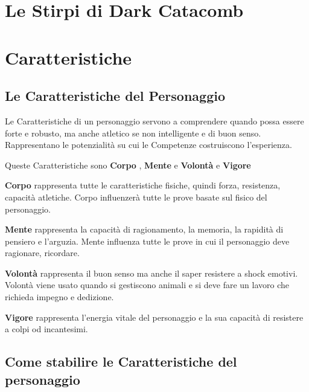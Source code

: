 \documentclass[12pt,a4paper,twoside,openany]{book}
\begin{document}
\section{Le Stirpi di Dark Catacomb}

\begin{multicols}{2}
	
\end{multicols}



\pagebreak

\section{Caratteristiche}

\begin{multicols}{2}

\subsection{Le Caratteristiche del Personaggio}

Le Caratteristiche di un personaggio servono a comprendere quando possa essere forte e robusto, ma anche atletico se non intelligente e di buon senso. Rappresentano le potenzialità su cui le Competenze costruiscono l'esperienza.

Queste Caratteristiche sono \textbf{Corpo} , \textbf{Mente}  e \textbf{Volontà}  e \textbf{Vigore}

\textbf{Corpo} rappresenta tutte le caratteristiche fisiche, quindi forza, resistenza, capacità atletiche. Corpo influenzerà tutte le prove basate sul fisico del personaggio.

\textbf{Mente} rappresenta la capacità di ragionamento, la memoria, la rapidità di pensiero e l'arguzia. Mente influenza tutte le prove in cui il personaggio deve ragionare, ricordare.

\textbf{Volontà} rappresenta il buon senso ma anche il saper resistere a shock emotivi. Volontà viene usato quando si gestiscono animali e si deve fare un lavoro che richieda impegno e dedizione.

\textbf{Vigore} rappresenta l'energia vitale del personaggio e la sua capacità di resistere a colpi od incantesimi.

\subsection{Come stabilire le Caratteristiche del personaggio}


\end{multicols}
\end{document}
